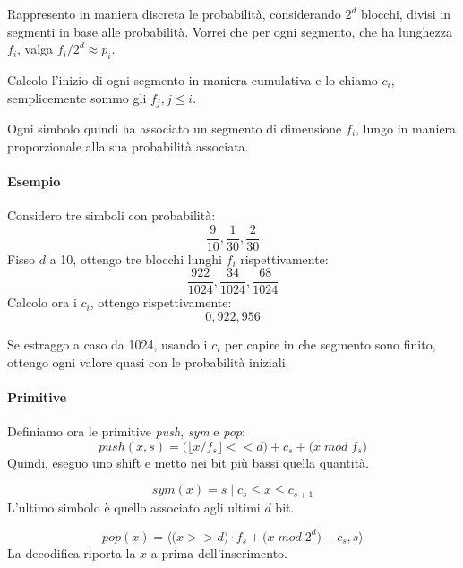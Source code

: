 Rappresento in maniera discreta le probabilità, considerando $2^d$ blocchi, divisi in segmenti in base alle probabilità. 
Vorrei che per ogni segmento, che ha lunghezza $f_i$, valga $f_i/2^d \approx p_i$.

Calcolo l'inizio di ogni segmento in maniera cumulativa e lo chiamo $c_i$, semplicemente sommo gli $f_j, j \leq i$.

Ogni simbolo quindi ha associato un segmento di dimensione $f_i$, lungo 
in maniera proporzionale alla sua probabilità associata.

\paragraph{Esempio}
Considero tre simboli con probabilità: $$\frac{9}{10}, \frac{1}{30}, \frac{2}{30}$$
Fisso $d$ a 10, ottengo tre blocchi lunghi $f_i$ rispettivamente: 
$$\frac{922}{1024}, \frac{34}{1024}, \frac{68}{1024}$$
Calcolo ora i $c_i$, ottengo rispettivamente: 
$$0, 922, 956$$
\begin{remark}
    Se estraggo a caso da 1024, usando i $c_i$ per capire in che segmento sono finito, 
    ottengo ogni valore quasi con le probabilità iniziali. 
\end{remark}

\paragraph{Primitive}
Definiamo ora le primitive \emph{push}, \emph{sym} e \emph{pop}:
$$\mathit{push}(x, s) = \big( \big\lfloor x/ f_s \big\rfloor << d \big)
+ c_s + \big( x\;\textit{mod}\;f_s \big)$$
Quindi, eseguo uno shift e metto nei bit più bassi quella quantità.

$$\mathit{sym}(x) = s\; | \; c_s \leq x \leq c_{s+1}$$
L'ultimo simbolo è quello associato agli ultimi $d$ bit. 

$$\mathit{pop}(x) = \langle \big(x >> d\big) \cdot f_s + \big( x\;\textit{mod}\;2^d \big) - c_s, s \rangle$$
La decodifica riporta la $x$ a prima dell'inserimento.

